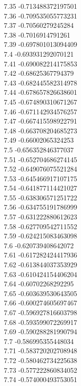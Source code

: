 {7.35	-0.713488372197501\\
7.36	-0.709535055773231\\
7.37	-0.70560279245284\\
7.38	-0.7016914791261\\
7.39	-0.697801013094409\\
7.4	-0.693931292070121\\
7.41	-0.690082214175853\\
7.42	-0.68625367794379\\
7.43	-0.682445582314978\\
7.44	-0.678657826638601\\
7.45	-0.674890310671267\\
7.46	-0.671142934576257\\
7.47	-0.667415598922791\\
7.48	-0.663708204685273\\
7.49	-0.66002065324253\\
7.5	-0.656352846377037\\
7.51	-0.652704686274145\\
7.52	-0.649076075521284\\
7.53	-0.645466917107175\\
7.54	-0.641877114421027\\
7.55	-0.638306571251722\\
7.56	-0.634755191786999\\
7.57	-0.631222880612623\\
7.58	-0.627709542711552\\
7.59	-0.624215083463098\\
7.6	-0.620739408642072\\
7.61	-0.617282424417936\\
7.62	-0.613844037353929\\
7.63	-0.610424154406204\\
7.64	-0.60702268292295\\
7.65	-0.603639530643505\\
7.66	-0.600274605697467\\
7.67	-0.596927816603798\\
7.68	-0.593599072269917\\
7.69	-0.590288281990794\\
7.7	-0.586995355448034\\
7.71	-0.583720202708948\\
7.72	-0.580462734225638\\
7.73	-0.577222860834052\\
7.74	-0.574000493753051\\
}
